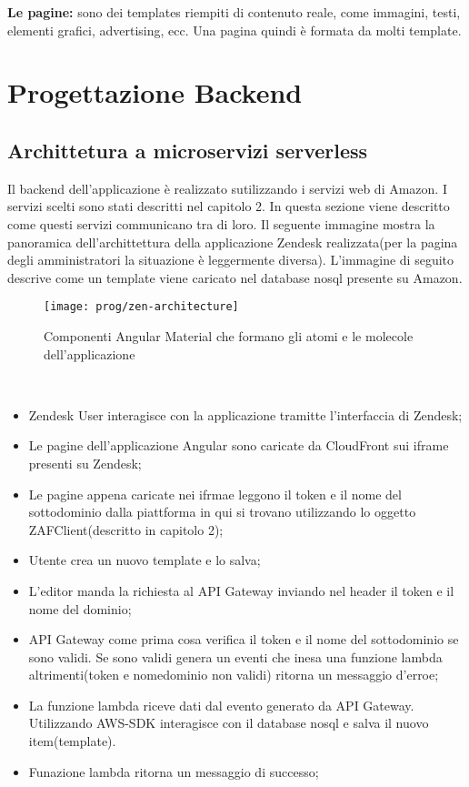 \textbf{Le pagine:} sono dei templates riempiti di contenuto reale, come immagini, testi, elementi grafici, advertising, ecc. Una pagina quindi è formata da molti template. 
\newpage
\section{Progettazione Backend}
\subsection{Archittetura a microservizi serverless}
Il backend dell'applicazione è realizzato sutilizzando i servizi web di Amazon. I servizi scelti sono stati descritti nel capitolo 2. In questa sezione viene descritto come questi servizi communicano tra di loro. Il seguente immagine mostra la panoramica dell'archittettura della applicazione Zendesk realizzata(per la pagina degli amministratori la situazione è leggermente diversa). L'immagine di seguito descrive come un template viene caricato nel database nosql presente su Amazon. 
\begin{figure}[!h] 
	\centering 
	\texttt{[image: prog/zen-architecture]} 
	\caption{Componenti Angular Material che formano gli atomi e le molecole dell'applicazione}
\end{figure} 
\\
\begin{itemize}
	\item Zendesk User interagisce con la applicazione tramitte l'interfaccia di Zendesk;
	\item Le pagine dell'applicazione Angular sono caricate da CloudFront sui iframe presenti su Zendesk;
	\item Le pagine appena caricate nei ifrmae leggono il token e il nome del sottodominio dalla piattforma in qui si trovano utilizzando lo oggetto ZAFClient(descritto in capitolo 2);
	\item Utente crea un nuovo template e lo salva;
	\item L'editor manda la richiesta al API Gateway inviando nel header il token e il nome del dominio;
	\item API Gateway come prima cosa verifica il token e il nome del sottodominio se sono validi. Se sono validi genera un eventi che inesa una funzione lambda altrimenti(token e nomedominio non validi) ritorna un messaggio d'erroe;
	\item La funzione lambda riceve dati dal evento generato da API Gateway. Utilizzando AWS-SDK interagisce con il database nosql e salva il nuovo item(template).
	\item Funazione lambda ritorna un messaggio di successo;
\end{itemize}
